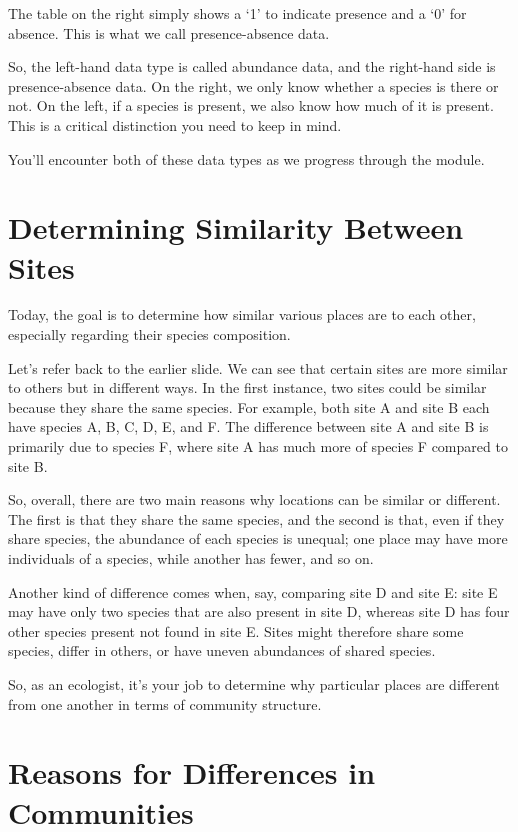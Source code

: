 \documentclass[
  11pt,
]{book}
\begin{document}
The table on the right simply shows a `1' to indicate presence and a `0'
for absence. This is what we call presence-absence data.

So, the left-hand data type is called abundance data, and the right-hand
side is presence-absence data. On the right, we only know whether a
species is there or not. On the left, if a species is present, we also
know how much of it is present. This is a critical distinction you need
to keep in mind.

You'll encounter both of these data types as we progress through the
module.

\section{Determining Similarity Between
Sites}\label{determining-similarity-between-sites}

Today, the goal is to determine how similar various places are to each
other, especially regarding their species composition.

Let's refer back to the earlier slide. We can see that certain sites are
more similar to others but in different ways. In the first instance, two
sites could be similar because they share the same species. For example,
both site A and site B each have species A, B, C, D, E, and F. The
difference between site A and site B is primarily due to species F,
where site A has much more of species F compared to site B.

So, overall, there are two main reasons why locations can be similar or
different. The first is that they share the same species, and the second
is that, even if they share species, the abundance of each species is
unequal; one place may have more individuals of a species, while another
has fewer, and so on.

Another kind of difference comes when, say, comparing site D and site E:
site E may have only two species that are also present in site D,
whereas site D has four other species present not found in site E. Sites
might therefore share some species, differ in others, or have uneven
abundances of shared species.

So, as an ecologist, it's your job to determine why particular places
are different from one another in terms of community structure.

\section{Reasons for Differences in
Communities}\label{reasons-for-differences-in-communities}
\end{document}
